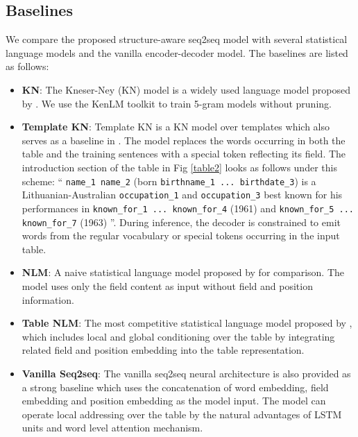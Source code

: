 \documentclass[letterpaper]{article} %
\begin{document}
\subsection{Baselines}
We compare the proposed structure-aware seq2seq model with several statistical language models and the vanilla encoder-decoder model.
The baselines are listed as follows:
\begin{itemize}
	\item \textbf{KN}: The Kneser-Ney (KN) model is a widely used language model proposed by \citeauthor{heafield2013scalable} . We use the KenLM toolkit to train 5-gram models without pruning.
	\item \textbf{Template KN}: Template KN is a KN model over templates which also serves as a baseline in \cite{lebret2016neural}. The model replaces the words occurring in both the table and the training sentences with a special token reflecting its field. The introduction section of the table in Fig \ref{table2} looks as follows under this scheme: `` \texttt{name\_1 name\_2} (born \texttt{birthname\_1 
... birthdate\_3}) is a Lithuanian-Australian \texttt{occupation\_1} and \texttt{occupation\_3} best known for his performances in \texttt{known\_for\_1 ... known\_for\_4} (1961) and \texttt{known\_for\_5 ... known\_for\_7} (1963) ''. During inference, the decoder is constrained to emit words from the regular vocabulary or special tokens occurring in the input table. 
	\item  \textbf{NLM}: A naive statistical language model proposed by \cite{lebret2016neural} for comparison. The model uses only the field content as input without field and position information.
	\item \textbf{Table NLM}: The most competitive statistical language model proposed by \cite{lebret2016neural}, which includes local and global conditioning over the table by integrating related field and position embedding into the table representation.
	\item \textbf{Vanilla Seq2seq}: The vanilla seq2seq neural architecture is also provided as a strong baseline which uses the concatenation of word embedding, field embedding and position embedding as the model input. The model can operate local addressing over the table by the natural advantages of LSTM units and word level attention mechanism. 
\end{itemize}
\end{document}
